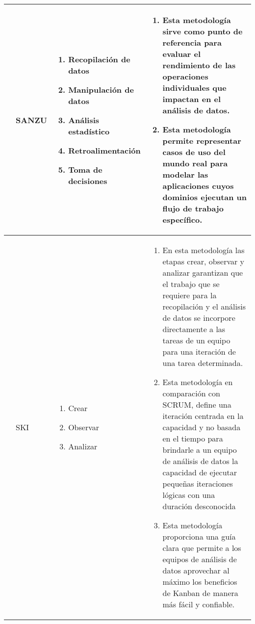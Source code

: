 \begin{table*}
	\begin{threeparttable}	
		\begin{tabular}{ p{2cm} p{4cm} p{5cm} p{6cm}  } \toprule
			\citep{Watson2017}
			&SANZU
			&  \begin{enumerate}
				\item Recopilación de datos
				\item Manipulación de datos
				\item Análisis estadístico
				\item Retroalimentación
				\item Toma de decisiones 
			\end{enumerate}
			& \begin{enumerate}
				\item Esta metodología sirve como punto de referencia para evaluar el rendimiento de las operaciones individuales que impactan en el análisis de datos.
				\item Esta metodología permite representar casos de uso del mundo real para modelar las aplicaciones cuyos dominios ejecutan un flujo de trabajo específico.
			\end{enumerate}
			\\ \hline
			\citep{Saltz2019}
			&SKI
			&  \begin{enumerate}
				\item Crear
				\item Observar
				\item Analizar
			\end{enumerate}
			& \begin{enumerate}
				\item En esta metodología las etapas crear, observar y analizar garantizan que el trabajo que se requiere para la recopilación y el análisis de datos se incorpore directamente a las tareas de un equipo para una iteración de una tarea determinada.  
				\item Esta metodología en comparación con SCRUM, define una iteración centrada en la capacidad y no basada en el tiempo para brindarle a un equipo de análisis de datos la capacidad de ejecutar pequeñas iteraciones lógicas con una duración desconocida
				\item Esta metodología proporciona una guía clara que permite a los equipos de análisis de datos aprovechar al máximo los beneficios de Kanban de manera más fácil y confiable.

\end{enumerate}
\end{tabular}
\end{threeparttable}
\end{table*}
